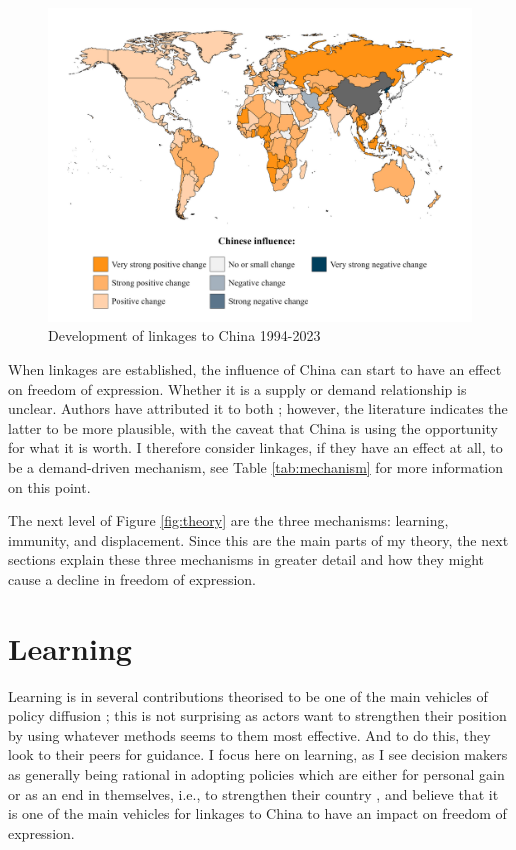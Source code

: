\begin{figure}
    \centering
    \includegraphics[width=\linewidth]{graphics/chinese_influence.jpeg}
    \caption{Development of linkages to China 1994-2023}
    \label{fig:link-china}
\end{figure}

When linkages are established, the influence of China can start to have an effect on freedom of expression. Whether it is a supply or demand relationship is unclear. Authors have attributed it to both \citep[e.g., see:][]{ambrosio_rise_2012, bader_china_2015, brand_authoritarian_2015, economy_exporting_2020, gamso_is_2021, loughlin_chinese_2021, risse_democracy_2015, toettoe_foreign_2023, weyland_autocratic_2017}; however, the literature indicates the latter to be more plausible, with the caveat that China is using the opportunity for what it is worth. I therefore consider linkages, if they have an effect at all, to be a demand-driven mechanism, see Table \ref{tab:mechanism} for more information on this point. 

The next level of Figure \ref{fig:theory} are the three mechanisms: learning, immunity, and displacement. Since this are the main parts of my theory, the next sections explain these three mechanisms in greater detail and how they might cause a decline in freedom of expression.

\section{Learning}
Learning is in several contributions theorised to be one of the main vehicles of policy diffusion \citep{gilardi_four_2016, shipan_mechanisms_2008, simmons_introduction_2006}; this is not surprising as actors want to strengthen their position by using whatever methods seems to them most effective. And to do this, they look to their peers for guidance. I focus here on learning, as I see decision makers as generally being rational in adopting policies which are either for personal gain or as an end in themselves, i.e., to strengthen their country \citep{shipan_mechanisms_2008}, and believe that it is one of the main vehicles for linkages to China to have an impact on freedom of expression.

